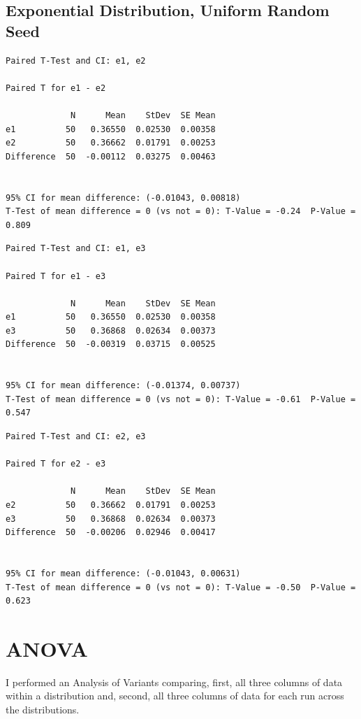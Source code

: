 \documentclass[letterpaper,10pt]{article}
\begin{document}
\subsection{Exponential Distribution, Uniform Random Seed}
\begin{samepage}
\begin{verbatim}
Paired T-Test and CI: e1, e2 

Paired T for e1 - e2

             N      Mean    StDev  SE Mean
e1          50   0.36550  0.02530  0.00358
e2          50   0.36662  0.01791  0.00253
Difference  50  -0.00112  0.03275  0.00463


95% CI for mean difference: (-0.01043, 0.00818)
T-Test of mean difference = 0 (vs not = 0): T-Value = -0.24  P-Value = 0.809
\end{verbatim}
\end{samepage}
\begin{samepage}
\begin{verbatim}
Paired T-Test and CI: e1, e3 

Paired T for e1 - e3

             N      Mean    StDev  SE Mean
e1          50   0.36550  0.02530  0.00358
e3          50   0.36868  0.02634  0.00373
Difference  50  -0.00319  0.03715  0.00525


95% CI for mean difference: (-0.01374, 0.00737)
T-Test of mean difference = 0 (vs not = 0): T-Value = -0.61  P-Value = 0.547
\end{verbatim}
\end{samepage}
\begin{samepage}
\begin{verbatim}
Paired T-Test and CI: e2, e3 

Paired T for e2 - e3

             N      Mean    StDev  SE Mean
e2          50   0.36662  0.01791  0.00253
e3          50   0.36868  0.02634  0.00373
Difference  50  -0.00206  0.02946  0.00417


95% CI for mean difference: (-0.01043, 0.00631)
T-Test of mean difference = 0 (vs not = 0): T-Value = -0.50  P-Value = 0.623
\end{verbatim}
\end{samepage}

\section{ANOVA}
I performed an Analysis of Variants comparing, first, all three columns of data within a distribution and, second, all three columns of data for each run across the distributions.
\end{document}
